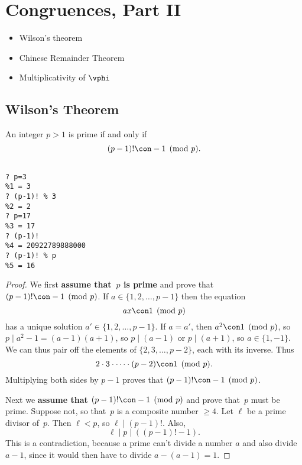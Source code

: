 \documentclass[11pt]{report}
\begin{document}
\chapter{Congruences, Part II}


\begin{itemize}
  \item Wilson's theorem
  \item Chinese Remainder Theorem
  \item Multiplicativity of $\vphi$
\end{itemize}

\section{Wilson's Theorem}
\begin{theorem}
  An integer $p>1$ is prime if and only if
  $$(p-1)! \con -1 \pmod{p}.$$
\end{theorem}
\begin{example}
  \begin{verbatim}

? p=3
%1 = 3
? (p-1)! % 3
%2 = 2
? p=17
%3 = 17
? (p-1)!
%4 = 20922789888000
? (p-1)! % p
%5 = 16
\end{verbatim}
\end{example}

\begin{proof}
  We first {\bf assume that~$p$ is prime} and prove that
  $(p-1)! \con -1\pmod{p}$.  If $a\in\{1,2,\ldots,p-1\}$ then
  the equation
  $$
    ax\con 1\pmod{p}
  $$
  has a unique solution $a'\in\{1,2,\ldots,p-1\}$.
  If $a=a'$, then $a^2\con 1\pmod{p}$, so
  $p\mid a^2-1 = (a-1)(a+1)$, so
  $p\mid (a-1)$ or $p\mid (a+1)$, so $a\in\{1,-1\}$.
  We can thus pair off the elements of
  $\{2,3,\ldots,p-2\}$,
  each with its inverse.
  Thus
  $$
    2\cdot 3 \cdot \cdots \cdot (p-2) \con 1\pmod{p}.
  $$
  Multiplying both sides by $p-1$ proves that
  $(p-1)! \con -1\pmod{p}$.


  Next we {\bf assume that $(p-1)! \con -1\pmod{p}$} and
  prove that~$p$ must be prime.  Suppose not, so that~$p$
  is a composite number $\geq 4$.  Let $\ell$ be a prime divisor
  of~$p$.  Then $\ell<p$, so $\ell\mid (p-1)!$.  Also,
  $$
    \ell \mid p \mid ((p-1)! - 1).
  $$
  This is a contradiction, because a prime can't divide a number $a$ and
  also divide $a-1$, since it would then have to divide $a-(a-1)=1$.
\end{proof}
\end{document}

